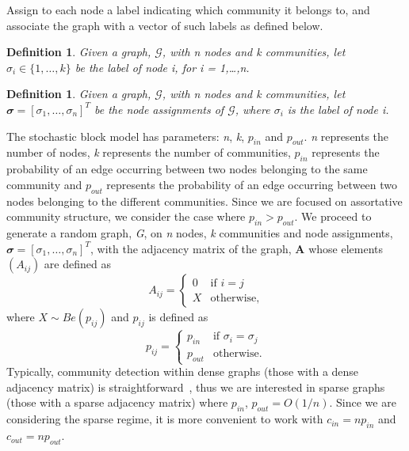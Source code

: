 \documentclass[12pt]{article}
\numberwithin{equation}{section}
\newtheorem{definition}[theorem]{Definition}
\begin{document}
Assign to each node a label indicating which community it belongs to, and associate the graph with a vector of such labels as defined below.
\begin{definition}
\label{def:nodeLabel}
	Given a graph, $\mathcal{G}$, with n nodes and k communities, let $\sigma_{i} \in \{1,\dots,k\}$ be the label of node i, for i = 1,\dots,n.
\end{definition}
\begin{definition}
\label{def:nodeAssignments}
	Given a graph, $\mathcal{G}$, with n nodes and k communities, let $\mathbfit{\sigma} = [\sigma_{1},\dots,\sigma_{n}]^{T}$ be the node assignments of $\mathcal{G}$, where $\sigma_{i}$ is the label of node i.
\end{definition}
The stochastic block model has parameters: \textsl{n}, \textsl{k}, \textsl{$p_{in}$} and \textsl{$p_{out}$}. \textsl{n} represents the number of nodes, \textsl{k} represents the number of communities, \textsl{$p_{in}$} represents the probability of an edge occurring between two nodes belonging to the same community and \textsl{$p_{out}$} represents the probability of an edge occurring between two nodes belonging to the different communities. Since we are focused on assortative community structure, we consider the case where $p_{in} > p_{out}$. We proceed to generate a random graph, \textsl{G}, on \textsl{n} nodes, \textsl{k} communities and node assignments, \textsl{$\mathbfit{\sigma} = [\sigma_{1},\dots,\sigma_{n}]^{T}$}, with the adjacency matrix of the graph, $\mathbf{A}$ whose elements $(A_{ij})$ are defined as
\begin{equation*}
	A_{ij} =
	\begin{cases}
		0 & \text{if } i = j\\
		X & \text{otherwise},
	\end{cases}
\end{equation*}
where $X \sim Be(p_{ij})$ and \textsl{$p_{ij}$} is defined as
\begin{equation*}
	p_{ij} =
	\begin{cases}
		p_{in} & \text{if } \sigma_{i} = \sigma_{j}\\
		p_{out} & \text{otherwise}.
	\end{cases}
\end{equation*}
Typically, community detection within dense graphs (those with a dense adjacency matrix) is straightforward~\cite{DKM+13}, thus we are interested in sparse graphs (those with a sparse adjacency matrix) where $p_{in}$, $p_{out} = O(1/n)$. Since we are considering the sparse regime, it is more convenient to work with $c_{in} = np_{in}$ and $c_{out} = np_{out}$.
\end{document}
